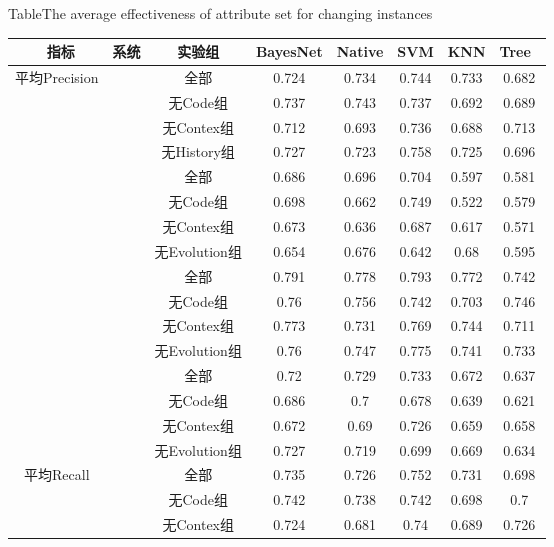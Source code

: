 \begin{table} [htbp]
\renewcommand\arraystretch{0.65} 
{Table$\!$}{The average effectiveness of attribute set for changing instances}
\vspace{0.5em}
\centering
\footnotesize
\begin{tabular}{cccccccc}
\toprule[1.5pt]
~{指标}&{系统}&{实验组}&{BayesNet}&{Native}&{SVM}&{KNN}&{Tree}~\\
\midrule[1pt]
\multirow{16}{*}{平均Precision}
&~\multirow{4}{*}{ArgoUML}
&全部& 0.724    & 0.734  & 0.744 & 0.733 & 0.682 \\
&&无Code组 & 0.737    & 0.743  & 0.737 & 0.692 & 0.689 \\
&&无Contex组  & 0.712    & 0.693  & 0.736 & 0.688 & 0.713 \\
&&无History组 & 0.727    & 0.723  & 0.758 & 0.725 & 0.696 \\
\cline{2-8}
&~\multirow{4}{*}{jEdit}
&全部  & 0.686    & 0.696  & 0.704 & 0.597 & 0.581 \\
&&无Code组   & 0.698    & 0.662  & 0.749 & 0.522 & 0.579 \\
&&无Contex组  & 0.673    & 0.636  & 0.687 & 0.617 & 0.571 \\
&&无Evolution组& 0.654    & 0.676  & 0.642 & 0.68  & 0.595 \\
\cline{2-8}
&~\multirow{4}{*}{jFreeChart}
&全部   & 0.791    & 0.778  & 0.793 & 0.772 & 0.742 \\
&&无Code组   & 0.76     & 0.756  & 0.742 & 0.703 & 0.746 \\
&&无Contex组  & 0.773    & 0.731  & 0.769 & 0.744 & 0.711 \\
&&无Evolution组& 0.76     & 0.747  & 0.775 & 0.741 & 0.733 \\
\cline{2-8}
&~\multirow{4}{*}{Tuxguitar} 
&全部    & 0.72     & 0.729  & 0.733 & 0.672 & 0.637 \\
&&无Code组   & 0.686    & 0.7    & 0.678 & 0.639 & 0.621 \\
&&无Contex组 & 0.672    & 0.69   & 0.726 & 0.659 & 0.658 \\
&&无Evolution组& 0.727    & 0.719  & 0.699 & 0.669 & 0.634 \\
\hline
\multirow{16}{*}{平均Recall}&
~\multirow{4}{*}{ArgoUML}
&全部   & 0.735    & 0.726  & 0.752 & 0.731 & 0.698 \\
&&无Code组  & 0.742    & 0.738  & 0.742 & 0.698 & 0.7   \\
&&无Contex组 & 0.724    & 0.681  & 0.74  & 0.689 & 0.726 \\

\end{tabular}
\end{table}
